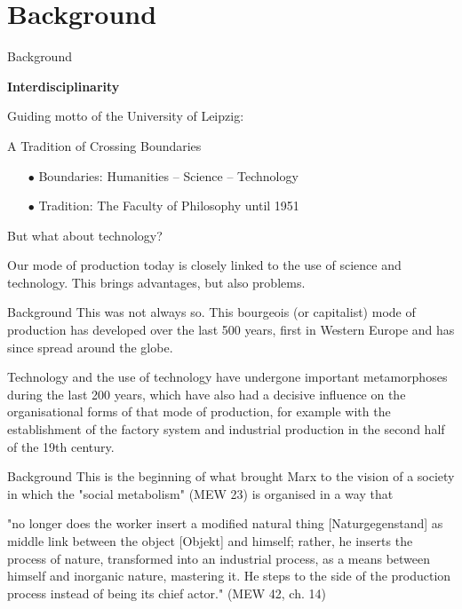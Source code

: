 \documentclass{beamer}
\title{Modelling Sustainable Systems\\ and Semantic Web\\[6pt] Introduction
  \vskip1em}
\subtitle{Lecture in the Module 10-202-2309\\ for Master Computer Science}
\author{Prof. Dr. Hans-Gert Gräbe\\
\url{http://www.informatik.uni-leipzig.de/~graebe}}
\date{April 2021}
\newcommand{\ueberschrift}[1]{\begin{center}\bf #1\end{center}}
\begin{document}
{
\begin{frame}
  \titlepage
\end{frame}}

\section{Background}
\begin{frame}{Background}

\ueberschrift{Interdisciplinarity}

Guiding motto of the University of Leipzig:
\begin{center}
  A Tradition of Crossing Boundaries
\end{center}

\begin{itemize}
\item[$\bullet$]  Boundaries: Humanities -- Science -- Technology
\item[$\bullet$]  Tradition: The Faculty of Philosophy until 1951
\end{itemize}

But what about technology?

Our mode of production today is closely linked to the use of science and
technology. This brings advantages, but also problems.
\end{frame}

\begin{frame}{Background}
This was not always so. This bourgeois (or capitalist) mode of production has
developed over the last 500 years, first in Western Europe and has since
spread around the globe.

Technology and the use of technology have undergone important metamorphoses
during the last 200 years, which have also had a decisive influence on the
organisational forms of that mode of production, for example with the
establishment of the factory system and industrial production in the second
half of the 19th century.  
\end{frame}

\begin{frame}{Background}
This is the beginning of what brought Marx to the vision of a society in which
the "social metabolism" (MEW 23) is organised in a way that

"no longer does the worker insert a modified natural thing [Naturgegenstand] as
middle link between the object [Objekt] and himself; rather, he inserts the
process of nature, transformed into an industrial process, as a means between
himself and inorganic nature, mastering it. He steps to the side of the
production process instead of being its chief actor." (MEW 42, ch. 14)
\end{frame}
\end{document}

